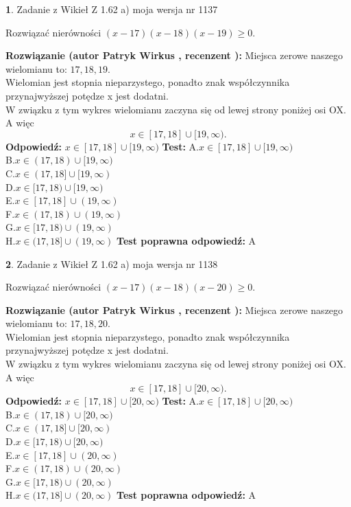 \documentclass[12pt, a4paper]{article}
\theoremstyle{definition} %
\newtheorem{zad}{}
\newcommand{\zadStart}[1]{\begin{zad}#1\newline}
\newcommand{\zadStop}{\end{zad}}
\newcommand{\rozwStart}[2]{\noindent \textbf{Rozwiązanie (autor #1 , recenzent #2): }\newline}
\newcommand{\rozwStop}{\newline}
\newcommand{\odpStart}{\noindent \textbf{Odpowiedź:}\newline}
\newcommand{\odpStop}{\newline}
\newcommand{\testStart}{\noindent \textbf{Test:}\newline}
\newcommand{\testStop}{\newline}
\newcommand{\kluczStart}{\noindent \textbf{Test poprawna odpowiedź:}\newline}
\newcommand{\kluczStop}{\newline}
\begin{document}
\zadStart{Zadanie z Wikieł Z 1.62 a) moja wersja nr 1137}

Rozwiązać nierówności $(x-17)(x-18)(x-19)\ge0$.
\zadStop
\rozwStart{Patryk Wirkus}{}
Miejsca zerowe naszego wielomianu to: $17, 18, 19$.\\
Wielomian jest stopnia nieparzystego, ponadto znak współczynnika przy\linebreak najwyższej potędze x jest dodatni.\\ W związku z tym wykres wielomianu zaczyna się od lewej strony poniżej osi OX. A więc $$x \in [17,18] \cup [19,\infty).$$
\rozwStop
\odpStart
$x \in [17,18] \cup [19,\infty)$
\odpStop
\testStart
A.$x \in [17,18] \cup [19,\infty)$\\
B.$x \in (17,18) \cup [19,\infty)$\\
C.$x \in (17,18] \cup [19,\infty)$\\
D.$x \in [17,18) \cup [19,\infty)$\\
E.$x \in [17,18] \cup (19,\infty)$\\
F.$x \in (17,18) \cup (19,\infty)$\\
G.$x \in [17,18) \cup (19,\infty)$\\
H.$x \in (17,18] \cup (19,\infty)$
\testStop
\kluczStart
A
\kluczStop



\zadStart{Zadanie z Wikieł Z 1.62 a) moja wersja nr 1138}

Rozwiązać nierówności $(x-17)(x-18)(x-20)\ge0$.
\zadStop
\rozwStart{Patryk Wirkus}{}
Miejsca zerowe naszego wielomianu to: $17, 18, 20$.\\
Wielomian jest stopnia nieparzystego, ponadto znak współczynnika przy\linebreak najwyższej potędze x jest dodatni.\\ W związku z tym wykres wielomianu zaczyna się od lewej strony poniżej osi OX. A więc $$x \in [17,18] \cup [20,\infty).$$
\rozwStop
\odpStart
$x \in [17,18] \cup [20,\infty)$
\odpStop
\testStart
A.$x \in [17,18] \cup [20,\infty)$\\
B.$x \in (17,18) \cup [20,\infty)$\\
C.$x \in (17,18] \cup [20,\infty)$\\
D.$x \in [17,18) \cup [20,\infty)$\\
E.$x \in [17,18] \cup (20,\infty)$\\
F.$x \in (17,18) \cup (20,\infty)$\\
G.$x \in [17,18) \cup (20,\infty)$\\
H.$x \in (17,18] \cup (20,\infty)$
\testStop
\kluczStart
A
\kluczStop
\end{document}

